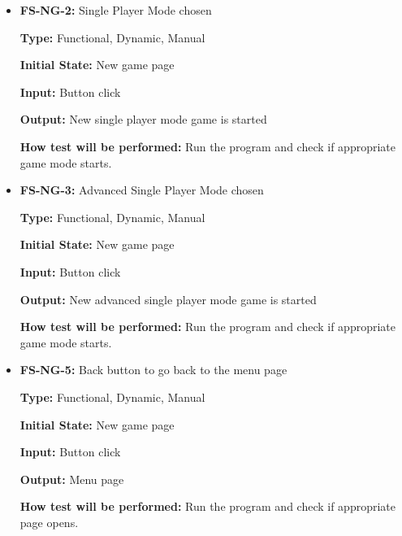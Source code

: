 \documentclass[12pt,letterpaper]{article}
\begin{document}
\begin{reqbox}
	\begin{itemize}
	\item \textbf{FS-NG-2: }Single Player Mode chosen

	\textbf{Type: }Functional, Dynamic, Manual

	\textbf{Initial State: }New game page

	\textbf{Input: }Button click

	\textbf{Output: }New single player mode game is started

	\textbf{How test will be performed: }Run the program and check if appropriate game mode starts.
	\end{itemize}
\end{reqbox}

\begin{reqbox}
	\begin{itemize}
	\item \textbf{FS-NG-3: }Advanced Single Player Mode chosen

	\textbf{Type: }Functional, Dynamic, Manual

	\textbf{Initial State: }New game page

	\textbf{Input: }Button click

	\textbf{Output: }New advanced single player mode game is started

	\textbf{How test will be performed: }Run the program and check if appropriate game mode starts.
	\end{itemize}
\end{reqbox}

\begin{reqbox}
	\begin{itemize}
	\item \textbf{FS-NG-5: }Back button to go back to the menu page

	\textbf{Type: }Functional, Dynamic, Manual

	\textbf{Initial State: }New game page

	\textbf{Input: }Button click

	\textbf{Output: }Menu page

	\textbf{How test will be performed: }Run the program and check if appropriate page opens.
	\end{itemize}
\end{reqbox}
\end{document}

